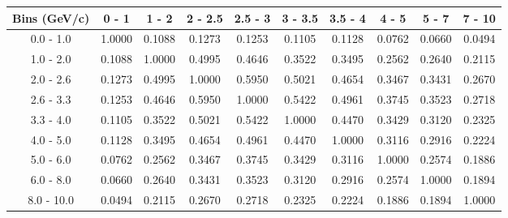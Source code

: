 \documentclass[aps, prd, reprint,showpacs,  preprintnumbers,amsmath,amssymb,superscriptaddress, nofootinbib]{revtex4-1}
\makeatletter
\renewenvironment{table}
  {\def\@captype{table}}
  {}
\makeatother
\begin{document}
\begin{table}
\centering
\begin{tabular}{cccccccccc}
\hline
Bins (GeV/c) & 0 - 1 & 1 - 2 & 2 - 2.5 & 2.5 - 3 & 3 - 3.5 & 3.5 - 4 & 4 - 5 & 5 - 7 & 7 - 10 \\ 
\hline
  0.0 -  1.0    &     1.0000  &     0.1088  &     0.1273  &     0.1253  &     0.1105  &     0.1128  &     0.0762  &     0.0660  &     0.0494   \\ 
  1.0 -  2.0    &     0.1088  &     1.0000  &     0.4995  &     0.4646  &     0.3522  &     0.3495  &     0.2562  &     0.2640  &     0.2115   \\ 
  2.0 -  2.6    &     0.1273  &     0.4995  &     1.0000  &     0.5950  &     0.5021  &     0.4654  &     0.3467  &     0.3431  &     0.2670   \\ 
  2.6 -  3.3    &     0.1253  &     0.4646  &     0.5950  &     1.0000  &     0.5422  &     0.4961  &     0.3745  &     0.3523  &     0.2718   \\ 
  3.3 -  4.0    &     0.1105  &     0.3522  &     0.5021  &     0.5422  &     1.0000  &     0.4470  &     0.3429  &     0.3120  &     0.2325   \\ 
  4.0 -  5.0    &     0.1128  &     0.3495  &     0.4654  &     0.4961  &     0.4470  &     1.0000  &     0.3116  &     0.2916  &     0.2224   \\ 
  5.0 -  6.0    &     0.0762  &     0.2562  &     0.3467  &     0.3745  &     0.3429  &     0.3116  &     1.0000  &     0.2574  &     0.1886   \\ 
  6.0 -  8.0    &     0.0660  &     0.2640  &     0.3431  &     0.3523  &     0.3120  &     0.2916  &     0.2574  &     1.0000  &     0.1894   \\ 
  8.0 - 10.0    &     0.0494  &     0.2115  &     0.2670  &     0.2718  &     0.2325  &     0.2224  &     0.1886  &     0.1894  &     1.0000   \\ 
\hline
\hline
\end{tabular}
\caption{Correlation matrix for bins of $d\sigma/dp_\mu$.}
\label{tb:pi0_mup_cov}
\end{table}

\vspace{0.7cm}
\end{document}
